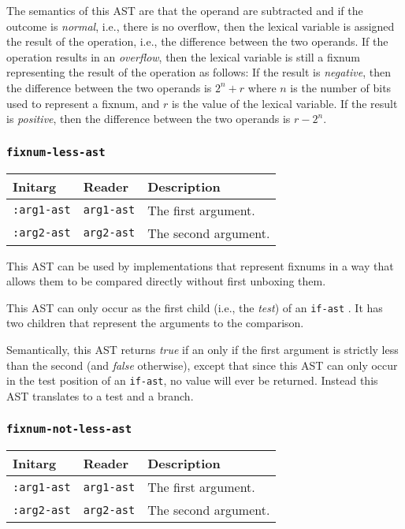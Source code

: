 The semantics of this AST are that the operand are subtracted and if
the outcome is \emph{normal}, i.e., there is no overflow, then the
lexical variable is assigned the result of the operation, i.e., the
difference between the two operands.  If the operation results in an
\emph{overflow}, then the lexical variable is still a fixnum
representing the result of the operation as follows: If the result is
\emph{negative}, then the difference between the two operands is $2^n
+ r$ where $n$ is the number of bits used to represent a fixnum, and
$r$ is the value of the lexical variable.  If the result is
\emph{positive}, then the difference between the two operands is $r -
2^n$.

\subsubsection{\texttt{fixnum-less-ast}}
\label{fixnum-less-ast}

\begin{tabular}{|l|l|l|}
\hline
Initarg & Reader & Description\\
\hline\hline
\texttt{:arg1-ast} & \texttt{arg1-ast} & The first argument.\\
\hline
\texttt{:arg2-ast} & \texttt{arg2-ast} & The second argument.\\
\hline
\end{tabular}

This AST can be used by implementations that represent fixnums in a
way that allows them to be compared directly without first unboxing
them.

This AST can only occur as the first child (i.e., the \emph{test}) of
an \texttt{if-ast} .  It has two children that
represent the arguments to the comparison.  

Semantically, this AST returns \emph{true} if an only if the first
argument is strictly less than the second (and \emph{false}
otherwise), except that since this AST can only occur in the test
position of an \texttt{if-ast}, no value will ever be returned.
Instead this AST translates to a test and a branch. 

\subsubsection{\texttt{fixnum-not-less-ast}}
\label{fixnum-not-less-ast}

\begin{tabular}{|l|l|l|}
\hline
Initarg & Reader & Description\\
\hline\hline
\texttt{:arg1-ast} & \texttt{arg1-ast} & The first argument.\\
\hline
\texttt{:arg2-ast} & \texttt{arg2-ast} & The second argument.\\
\hline
\end{tabular}

